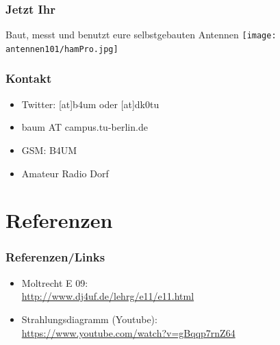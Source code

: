 \begin{frame}
    \frametitle{Jetzt Ihr}
    \begin{center} 	Baut, messt und benutzt eure selbstgebauten Antennen
        \texttt{[image: antennen101/hamPro.jpg]}
	\end{center}
\end{frame}

\begin{frame}
    \frametitle{Kontakt}
    	\begin{itemize}
		\item Twitter: [at]b4um oder [at]dk0tu
		\item baum AT campus.tu-berlin.de
		\item GSM: B4UM
		\item Amateur Radio Dorf
    \end{itemize}
\end{frame}


\section*{Referenzen}

\begin{frame}
    \frametitle{Referenzen/Links}
    
    \footnotesize
    \begin{itemize}
        \item Moltrecht E 09: \\
              \url{http://www.dj4uf.de/lehrg/e11/e11.html}
        \item Strahlungsdiagramm (Youtube): \\
              \url{https://www.youtube.com/watch?v=gBqqp7rnZ64}
    \end{itemize}

\end{frame}








\subtitle{Technik 11: \\
           Antennentechnik \\[2em]}
\date{Stand 30.11.2014}



